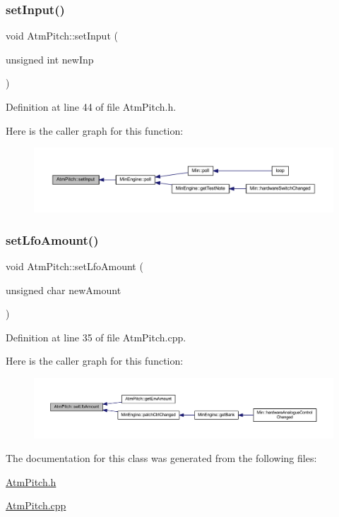 \subsubsection{\texorpdfstring{set\+Input()}{setInput()}}
{\footnotesize\ttfamily void Atm\+Pitch\+::set\+Input (\begin{DoxyParamCaption}\item[{unsigned int}]{new\+Inp }\end{DoxyParamCaption})\hspace{0.3cm}{\ttfamily [inline]}}



Definition at line 44 of file Atm\+Pitch.\+h.

Here is the caller graph for this function\+:
\nopagebreak
\begin{figure}[H]
\begin{center}
\leavevmode
\includegraphics[width=350pt]{dd/d34/class_atm_pitch_a5e7f1f2581cc25bb966fdfe0c945923d_icgraph}
\end{center}
\end{figure}
\mbox{\label{class_atm_pitch_a4d4617a54ac352f240b72f3b2194b6c7}} 
\subsubsection{\texorpdfstring{set\+Lfo\+Amount()}{setLfoAmount()}}
{\footnotesize\ttfamily void Atm\+Pitch\+::set\+Lfo\+Amount (\begin{DoxyParamCaption}\item[{unsigned char}]{new\+Amount }\end{DoxyParamCaption})}



Definition at line 35 of file Atm\+Pitch.\+cpp.

Here is the caller graph for this function\+:
\nopagebreak
\begin{figure}[H]
\begin{center}
\leavevmode
\includegraphics[width=350pt]{dd/d34/class_atm_pitch_a4d4617a54ac352f240b72f3b2194b6c7_icgraph}
\end{center}
\end{figure}


The documentation for this class was generated from the following files\+:\begin{DoxyCompactItemize}
\item 
\hyperlink{_atm_pitch_8h}{Atm\+Pitch.\+h}\item 
\hyperlink{_atm_pitch_8cpp}{Atm\+Pitch.\+cpp}\end{DoxyCompactItemize}
